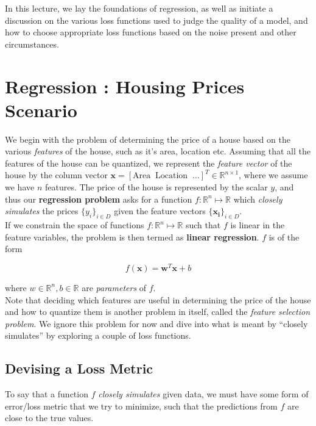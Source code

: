 \documentclass[12pt]{article}
\begin{document}
	\MakeScribeTop


In this lecture, we lay the foundations of regression, as well as initiate a discussion on the various loss functions used to judge the quality of a model, and how to choose appropriate loss functions based on the noise present and other circumstances.

\section{Regression : Housing Prices Scenario}

We begin with the problem of determining the price of a house based on the various \emph{features} of the house, such as it's area, location etc. Assuming that all the features of the house can be quantized, we represent the \emph{feature vector} of the house by the column vector $\boldsymbol{x} = [\mathrm{Area}\;\;\mathrm{Location}\;\;\hdots]^T\in\mathbb{R}^{n\times 1}$, where we assume we have $n$ features. The price of the house is represented by the scalar $y$, and thus our \textbf{regression problem} asks for a function  $f:\mathbb{R}^n\mapsto\mathbb{R}$ which \emph{closely simulates} the prices $\{y_i\}_{i\in D}$ given the feature vectors $\{\boldsymbol{x_i}\}_{i\in D}$. \\

If we constrain the space of functions $f:\mathbb{R}^n\mapsto\mathbb{R}$ such that $f$ is linear in the feature variables, the problem is then termed as \textbf{linear regression}. $f$ is of the form 

$$
f(\boldsymbol{x}) = \boldsymbol{w}^T\boldsymbol{x} + b
$$

where $w \in \mathbb{R}^n,  b \in \mathbb{R}$ are \emph{parameters} of $f$. \\

Note that deciding which features are useful in determining the price of the house and how to quantize them is another problem in itself, called the \emph{feature selection problem}. We ignore this problem for now and dive into what is meant by ``closely simulates'' by exploring a couple of loss functions.


\subsection*{Devising a Loss Metric}
To say that a function $f$ \emph{closely simulates} given data, we must have some form of error/loss metric that we try to minimize, such that the predictions from $f$ are close to the true values.
\end{document}
